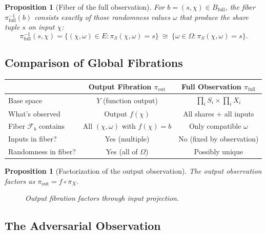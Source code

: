 \documentclass[11pt,a4paper]{article}
\theoremstyle{definition}
\theoremstyle{plain}
\newtheorem{proposition}[definition]{Proposition}
\newcommand{\cF}{\mathcal{F}}
\begin{document}
\begin{proposition}[Fiber of the full observation]
\label{prop:fiber-full-observation}
For $b=(s,\chi)\in B_{\mathrm{full}}$, the fiber $\pi_{\mathrm{full}}^{-1}(b)$ consists exactly of those randomness values $\omega$ that produce the share tuple $s$ on input $\chi$:
\[
\pi_{\mathrm{full}}^{-1}(s,\chi)=\{(\chi,\omega)\in E:\pi_S(\chi,\omega)=s\}
\ \cong\ \{\omega \in \Omega : \pi_S(\chi, \omega) = s\}.
\]
\end{proposition}

\subsection{Comparison of Global Fibrations}

\begin{center}
\begin{tabular}{l|c|c}
& \textbf{Output Fibration} $\pi_{\mathrm{out}}$ & \textbf{Full Observation} $\pi_{\mathrm{full}}$ \\
\hline
Base space & $Y$ (function output) & $\prod_i S_i \times \prod_i X_i$ \\
What's observed & Output $f(\chi)$ & All shares + all inputs \\
Fiber $\cF_b$ contains & All $(\chi, \omega)$ with $f(\chi) = b$ & Only compatible $\omega$ \\
Inputs in fiber? & Yes (multiple) & No (fixed by observation) \\
Randomness in fiber? & Yes (all of $\Omega$) & Possibly unique \\
\end{tabular}
\end{center}

\begin{proposition}[Factorization of the output observation]
\label{prop:output-factorization}
The output observation factors as $\pi_{\mathrm{out}} = f\circ \pi_X$.
\begin{figure}[ht]
\centering
{}
\caption{Output fibration factors through input projection.}
\label{fig:output-factorization}
\end{figure}
\end{proposition}

\subsection{The Adversarial Observation}
\end{document}
